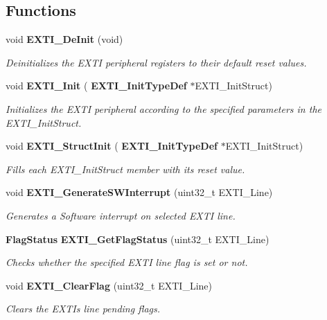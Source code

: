 \subsection*{Functions}
\begin{DoxyCompactItemize}
\item 
void \textbf{ E\+X\+T\+I\+\_\+\+De\+Init} (void)
\begin{DoxyCompactList}\small\item\em Deinitializes the E\+X\+TI peripheral registers to their default reset values. \end{DoxyCompactList}\item 
void \textbf{ E\+X\+T\+I\+\_\+\+Init} (\textbf{ E\+X\+T\+I\+\_\+\+Init\+Type\+Def} $\ast$E\+X\+T\+I\+\_\+\+Init\+Struct)
\begin{DoxyCompactList}\small\item\em Initializes the E\+X\+TI peripheral according to the specified parameters in the E\+X\+T\+I\+\_\+\+Init\+Struct. \end{DoxyCompactList}\item 
void \textbf{ E\+X\+T\+I\+\_\+\+Struct\+Init} (\textbf{ E\+X\+T\+I\+\_\+\+Init\+Type\+Def} $\ast$E\+X\+T\+I\+\_\+\+Init\+Struct)
\begin{DoxyCompactList}\small\item\em Fills each E\+X\+T\+I\+\_\+\+Init\+Struct member with its reset value. \end{DoxyCompactList}\item 
void \textbf{ E\+X\+T\+I\+\_\+\+Generate\+S\+W\+Interrupt} (uint32\+\_\+t E\+X\+T\+I\+\_\+\+Line)
\begin{DoxyCompactList}\small\item\em Generates a Software interrupt on selected E\+X\+TI line. \end{DoxyCompactList}\item 
\textbf{ Flag\+Status} \textbf{ E\+X\+T\+I\+\_\+\+Get\+Flag\+Status} (uint32\+\_\+t E\+X\+T\+I\+\_\+\+Line)
\begin{DoxyCompactList}\small\item\em Checks whether the specified E\+X\+TI line flag is set or not. \end{DoxyCompactList}\item 
void \textbf{ E\+X\+T\+I\+\_\+\+Clear\+Flag} (uint32\+\_\+t E\+X\+T\+I\+\_\+\+Line)
\begin{DoxyCompactList}\small\item\em Clears the E\+X\+TI\textquotesingle{}s line pending flags. \end{DoxyCompactList}\item 

\end{DoxyCompactItemize}
